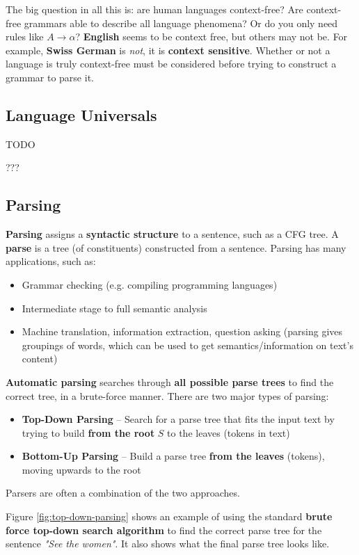 \documentclass{article}
\begin{document}
The big question in all this is: are human languages context-free? Are context-free grammars able to describe all language phenomena? Or do you only need rules like $A \rightarrow \alpha$? \textbf{English} seems to be context free, but others may not be. For example, \textbf{Swiss German} is \textit{not}, it is \textbf{context sensitive}. Whether or not a language is truly context-free must be considered before trying to construct a grammar to parse it.

\subsection{Language Universals}

TODO

???

\subsection{Parsing}

\textbf{Parsing} assigns a \textbf{syntactic structure} to a sentence, such as a CFG tree. A \textbf{parse} is a tree (of constituents) constructed from a sentence. Parsing has many applications, such as:
\begin{itemize}
	\item Grammar checking (e.g. compiling programming languages)
	\item Intermediate stage to full semantic analysis
	\item Machine translation, information extraction, question asking (parsing gives groupings of words, which can be used to get semantics/information on text's content)
\end{itemize}

\textbf{Automatic parsing} searches through \textbf{all possible parse trees} to find the correct tree, in a brute-force manner. There are two major types of parsing:
\begin{itemize}
	\item \textbf{Top-Down Parsing} -- Search for a parse tree that fits the input text by trying to build \textbf{from the root} $S$ to the leaves (tokens in text)
	\item \textbf{Bottom-Up Parsing} -- Build a parse tree \textbf{from the leaves} (tokens), moving upwards to the root
\end{itemize}
Parsers are often a combination of the two approaches.

Figure \ref{fig:top-down-parsing} shows an example of using the standard \textbf{brute force top-down search algorithm} to find the correct parse tree for the sentence \textit{"See the women"}. It also shows what the final parse tree looks like.
\end{document}
